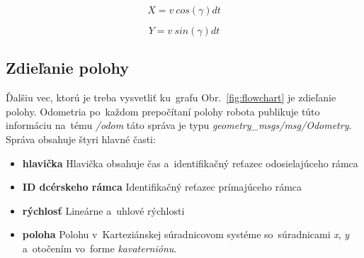 \begin{equation}
	X = v~cos(\gamma) dt
	\label{eq:posX}
\end{equation}


\begin{equation}
	Y = v~sin(\gamma) dt
	\label{eq:posY}
\end{equation}


\subsection{Zdieľanie polohy}
\label{sec:zdielanie_polohy}

Ďalšiu vec, ktorú je treba vysvetliť ku~grafu Obr.~\ref{fig:flowchart} je zdieľanie polohy. Odometria
po~každom prepočítaní polohy robota publikuje túto informáciu na~tému \textit{/odom} táto správa je typu
\textit{geometry\_msgs/msg/Odometry}. Správa obsahuje štyri hlavné časti:
\begin{itemize}
	\item \textbf{hlavička} Hlavička obsahuje čas a~identifikačný reťazec odosielajúceho rámca
	\item \textbf{ID dcérskeho rámca} Identifikačný reťazec prímajúceho rámca
	\item \textbf{rýchlosť} Lineárne a~uhlové rýchlosti
	\item \textbf{poloha} Polohu v~Karteziánskej súradnicovom systéme so~súradnicami \textit{x}, \textit{y}
		a~otočením vo~forme \textit{kavaterniónu}.
\end{itemize}

